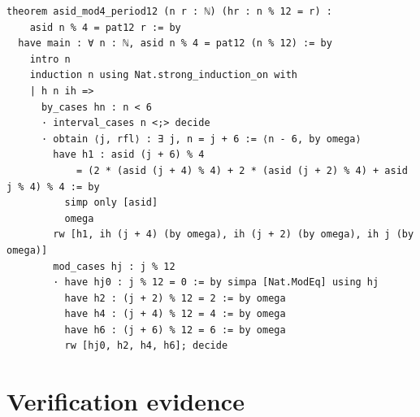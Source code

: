 \documentclass[11pt]{article}
\theoremstyle{definition}
\begin{document}
\begin{lstlisting}[caption={Theorem~\ref{thm:mod4}: statement, induction skeleton and the first of the twelve \texttt{mod\_cases} branches, verbatim from \texttt{final}\allowbreak/\texttt{01-comb08-sidemid-proved.lean} (lines 163--182, sha256 \texttt{19b5c390}). The remaining eleven branches are identical in shape (lines 183--237) and ship in this deposit under \texttt{proofs/}.},label={lst:proof-t3}]
theorem asid_mod4_period12 (n r : ℕ) (hr : n % 12 = r) :
    asid n % 4 = pat12 r := by
  have main : ∀ n : ℕ, asid n % 4 = pat12 (n % 12) := by
    intro n
    induction n using Nat.strong_induction_on with
    | h n ih =>
      by_cases hn : n < 6
      · interval_cases n <;> decide
      · obtain ⟨j, rfl⟩ : ∃ j, n = j + 6 := ⟨n - 6, by omega⟩
        have h1 : asid (j + 6) % 4
            = (2 * (asid (j + 4) % 4) + 2 * (asid (j + 2) % 4) + asid j % 4) % 4 := by
          simp only [asid]
          omega
        rw [h1, ih (j + 4) (by omega), ih (j + 2) (by omega), ih j (by omega)]
        mod_cases hj : j % 12
        · have hj0 : j % 12 = 0 := by simpa [Nat.ModEq] using hj
          have h2 : (j + 2) % 12 = 2 := by omega
          have h4 : (j + 4) % 12 = 4 := by omega
          have h6 : (j + 6) % 12 = 6 := by omega
          rw [hj0, h2, h4, h6]; decide
\end{lstlisting}

\section{Verification evidence}
\end{document}
